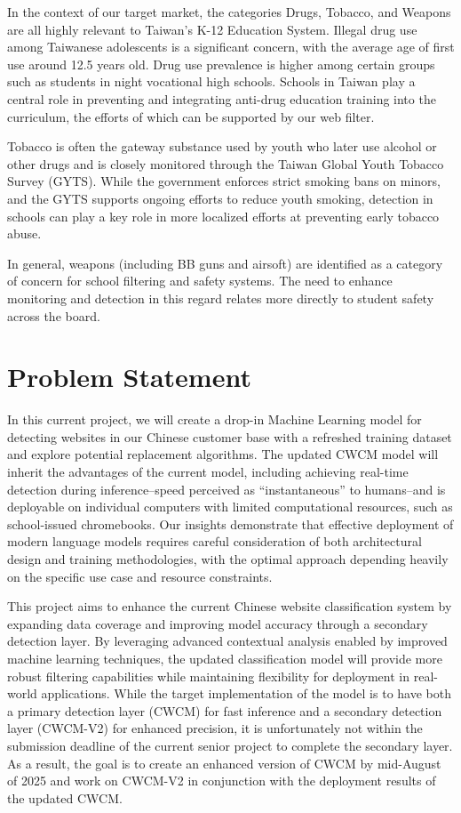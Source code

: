 \documentclass[
  titlepage]{article}
\begin{document}
In the context of our target market, the categories Drugs, Tobacco, and
Weapons are all highly relevant to Taiwan's K-12 Education System.
Illegal drug use among Taiwanese adolescents is a significant concern,
with the average age of first use around 12.5 years old. Drug use
prevalence is higher among certain groups such as students in night
vocational high schools. Schools in Taiwan play a central role in
preventing and integrating anti-drug education training into the
curriculum, the efforts of which can be supported by our web filter.

Tobacco is often the gateway substance used by youth who later use
alcohol or other drugs and is closely monitored through the Taiwan
Global Youth Tobacco Survey (GYTS). While the government enforces strict
smoking bans on minors, and the GYTS supports ongoing efforts to reduce
youth smoking, detection in schools can play a key role in more
localized efforts at preventing early tobacco abuse.

In general, weapons (including BB guns and airsoft) are identified as a
category of concern for school filtering and safety systems. The need to
enhance monitoring and detection in this regard relates more directly to
student safety across the board.

\section{Problem Statement}\label{problem-statement}

In this current project, we will create a drop-in Machine Learning model
for detecting websites in our Chinese customer base with a refreshed
training dataset and explore potential replacement algorithms. The
updated CWCM model will inherit the advantages of the current model,
including achieving real-time detection during inference--speed
perceived as ``instantaneous'' to humans--and is deployable on
individual computers with limited computational resources, such as
school-issued chromebooks. Our insights demonstrate that effective
deployment of modern language models requires careful consideration of
both architectural design and training methodologies, with the optimal
approach depending heavily on the specific use case and resource
constraints.

This project aims to enhance the current Chinese website classification
system by expanding data coverage and improving model accuracy through a
secondary detection layer. By leveraging advanced contextual analysis
enabled by improved machine learning techniques, the updated
classification model will provide more robust filtering capabilities
while maintaining flexibility for deployment in real-world applications.
While the target implementation of the model is to have both a primary
detection layer (CWCM) for fast inference and a secondary detection
layer (CWCM-V2) for enhanced precision, it is unfortunately not within
the submission deadline of the current senior project to complete the
secondary layer. As a result, the goal is to create an enhanced version
of CWCM by mid-August of 2025 and work on CWCM-V2 in conjunction with
the deployment results of the updated CWCM.
\end{document}
